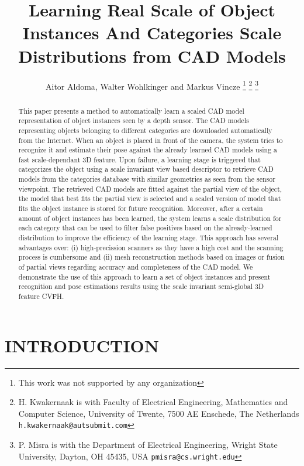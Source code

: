 \documentclass[a4paper, 10pt, conference]{ieeeconf}      %
\title{\LARGE \bf
Learning Real Scale of Object Instances And Categories Scale Distributions from CAD Models
}
\author{Aitor Aldoma, Walter Wohlkinger and Markus Vincze%
\thanks{This work was not supported by any organization}%
\thanks{H. Kwakernaak is with Faculty of Electrical Engineering, Mathematics and Computer Science,
        University of Twente, 7500 AE Enschede, The Netherlands
        {\tt\small h.kwakernaak@autsubmit.com}}%
\thanks{P. Misra is with the Department of Electrical Engineering, Wright State University,
        Dayton, OH 45435, USA
        {\tt\small pmisra@cs.wright.edu}}%
}
\begin{document}
\maketitle
\thispagestyle{empty}
\pagestyle{empty}


\begin{abstract}

This paper presents a method to automatically learn a scaled CAD model representation
of object instances seen by a depth sensor. The CAD models representing objects belonging to different categories
are downloaded automatically from the Internet. When an object is placed in front of the camera, the system tries
to recognize it and estimate their pose against the already learned CAD models using a fast scale-dependant 3D feature. Upon failure, a learning stage is triggered that
categorizes the object using a scale invariant view based descriptor to retrieve CAD models from the categories database with
similar geometries as seen from the sensor viewpoint. The retrieved CAD models are fitted against the partial view of the object, 
the model that best fits the partial view is selected and a scaled version of model that fits the object instance is stored for future recognition. Moreover, after
a certain amount of object instances has been learned, the system learns a scale distribution for each category that can be used to filter false
positives based on the already-learned distribution to improve the efficiency of the learning stage. This approach has several advantages over: (i) high-precission scanners as they
have a high cost and the scanning process is cumbersome and (ii) mesh reconstruction methods based on images or fusion of partial views regarding accuracy and completeness of the
CAD model. We demonstrate the use of this approach to learn a set of object instances and present recognition and pose estimations results using the scale invariant semi-global
3D feature CVFH.

\end{abstract}


\section{INTRODUCTION}

\end{document}
